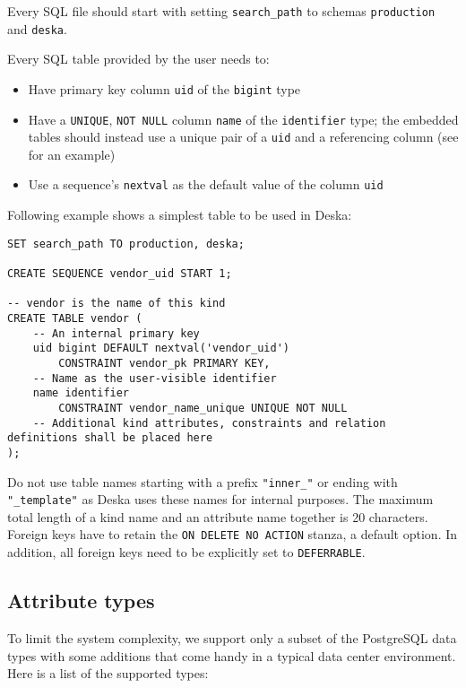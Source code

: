\documentclass[deska]{subfiles}
\begin{document}
Every SQL file should start with setting {\tt search\_path} to schemas {\tt production} and {\tt deska}.

Every SQL table provided by the user needs to:
\begin{itemize}
    \item Have primary key column {\tt uid} of the {\tt bigint} type
    \item Have a {\tt UNIQUE}, {\tt NOT NULL} column {\tt name} of the {\tt identifier} type; the embedded tables should instead use a
        unique pair of a {\tt uid} and a referencing column (see  for an example)
    \item Use a sequence's {\tt nextval} as the default value of the column {\tt uid}
\end{itemize}

Following example shows a simplest table to be used in Deska:

\begin{verbatim}
SET search_path TO production, deska;

CREATE SEQUENCE vendor_uid START 1;

-- vendor is the name of this kind
CREATE TABLE vendor (
    -- An internal primary key
    uid bigint DEFAULT nextval('vendor_uid')
        CONSTRAINT vendor_pk PRIMARY KEY,
    -- Name as the user-visible identifier
    name identifier
        CONSTRAINT vendor_name_unique UNIQUE NOT NULL
    -- Additional kind attributes, constraints and relation definitions shall be placed here
);
\end{verbatim}

Do not use table names starting with a prefix {\tt "inner\_"} or ending with {\tt "\_template"} as Deska uses these
names for internal purposes.  The maximum total length of a kind name and an attribute name together is 20 characters.
Foreign keys have to retain the {\tt ON DELETE NO ACTION} stanza, a default option. In addition, all foreign keys need
to be explicitly set to {\tt DEFERRABLE}.

\subsection{Attribute types}
\label{sec:db-att-types}
To limit the system complexity, we support only a subset of the PostgreSQL data types with some additions that come
handy in a typical data center environment.  Here is a list of the supported types:
\end{document}
